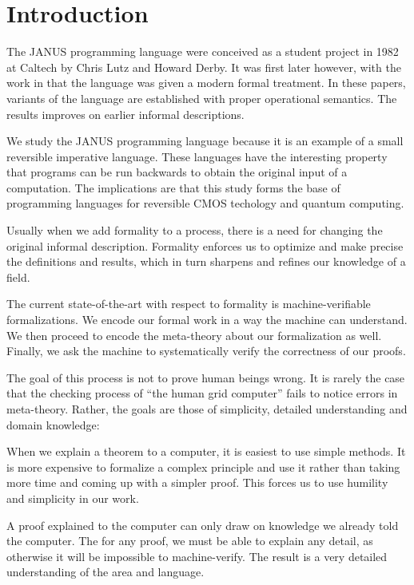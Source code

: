 \chapter{Introduction}

The JANUS programming language were conceived as a student project in
1982 at Caltech by Chris Lutz and Howard Derby. It was first later
however, with the work in \cite{glueck2007, glueck2008} that
the language was given a modern formal treatment. In these papers, variants
of the language are established with proper operational semantics. The
results improves on earlier informal descriptions.

We study the JANUS programming language because it is an example of a
small reversible imperative language. These languages have the
interesting property that programs can be run backwards to obtain
the original input of a computation. The implications are that this
study forms the base of programming languages for reversible CMOS
techology and quantum computing.

Usually when we add formality to a process, there is a need for
changing the original informal description. Formality enforces us to
optimize and make precise the definitions and results, which in turn
sharpens and refines our knowledge of a field.

The current state-of-the-art with respect to formality is
machine-verifiable formalizations. We encode our formal work in a way
the machine can understand. We then proceed to encode the meta-theory
about our formalization as well. Finally, we ask the machine to
systematically verify the correctness of our proofs.

The goal of this process is not to prove human beings wrong. It is
rarely the case that the checking process of ``the human grid
computer'' fails to notice errors in meta-theory. Rather, the goals
are those of simplicity, detailed understanding and domain knowledge:

When we explain a theorem to a computer, it is easiest to use simple
methods. It is more expensive to formalize a complex principle and use
it rather than taking more time and coming up with a simpler
proof. This forces us to use humility and simplicity in our work.

A proof explained to the computer can only draw on knowledge we
already told the computer. The for any proof, we must be able to
explain any detail, as otherwise it will be impossible to
machine-verify. The result is a very detailed understanding of the
area and language.

